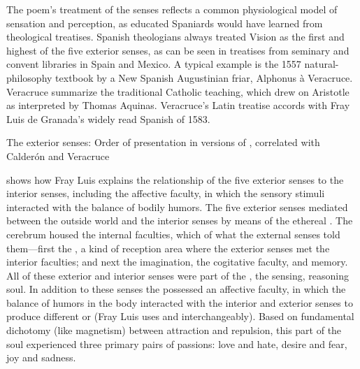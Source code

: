 The poem's treatment of the senses reflects a common physiological model of sensation and perception, as educated Spaniards would have learned from theological treatises.
Spanish theologians always treated Vision as the first and highest of the five exterior senses, as can be seen in treatises from seminary and convent libraries in Spain and Mexico.
A typical example is the 1557 natural-philosophy textbook  by a New Spanish Augustinian friar, Alphonus à Veracruce.%
    \Autocite{Veracruce:Phisica}
Veracruce summarize the traditional Catholic teaching, which drew on Aristotle as interpreted by Thomas Aquinas.%
Veracruce's Latin treatise accords with Fray Luis de Granada's widely read Spanish  of 1583.%
    \Autocites{LuisdeGranada:Simbolo}[(part I)]{LuisdeGranada-Balcells:SimboloPtI}

\begin{table}
    \caption{The exterior senses: Order of presentation in versions of , correlated with Calderón and Veracruce}
    \label{table:senses-order}
\end{table}

 shows how Fray Luis explains the relationship of the five exterior senses to the interior senses, including the affective faculty, in which the sensory stimuli interacted with the balance of bodily humors.
The five exterior senses mediated between the outside world and the interior senses by means of the ethereal .
The cerebrum housed the internal faculties, which  of what the external senses told them---first the , a kind of reception area where the exterior senses met the interior faculties; and next the imagination, the cogitative faculty, and memory.
All of these exterior and interior senses were part of the , the sensing, reasoning soul.
In addition to these senses the  possessed an affective faculty, in which the balance of humors in the body interacted with the interior and exterior senses to produce different  or  (Fray Luis uses  and  interchangeably).
Based on fundamental dichotomy (like magnetism) between attraction and repulsion, this  part of the soul experienced three primary pairs of passions: love and hate, desire and fear, joy and sadness.


